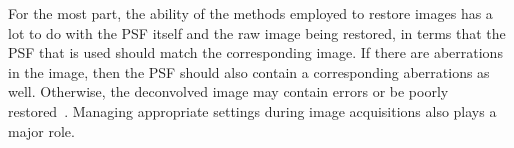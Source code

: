 For the most part, the ability of the methods employed to restore images has a lot to do with the PSF itself and the raw image being restored, in terms that the PSF that is used should match the corresponding image. 
If there are aberrations in the image, then the PSF should also contain a corresponding aberrations as well. 
Otherwise, the deconvolved image may contain errors or be poorly restored~\cite{DecArtif}. 
Managing appropriate settings during image acquisitions also plays a major role.






\renewcommand{\refname}{\spacedlowsmallcaps{References}} %

%




